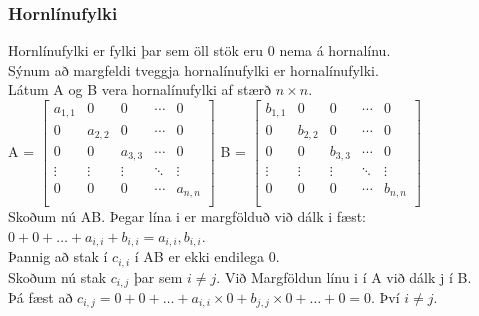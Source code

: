 \subsubsection{Hornlínufylki}
Hornlínufylki er fylki þar sem öll stök eru 0 nema á hornalínu.\\
Sýnum að margfeldi tveggja hornalínufylki er hornalínufylki.\\
Látum A og B vera hornalínufylki af stærð $n \times n$. \vspace*{1em}\\
A = 
$\begin{bmatrix}
    a_{1,1} & 0 & 0 & \cdots & 0 \\
    0 & a_{2,2} & 0 & \cdots & 0 \\
    0 & 0 & a_{3,3} & \cdots & 0 \\
    \vdots & \vdots & \vdots & \ddots & \vdots \\
    0 & 0 & 0 & \cdots & a_{n,n} \\
\end{bmatrix}$ B =
$\begin{bmatrix}
    b_{1,1} & 0 & 0 & \cdots & 0 \\
    0 & b_{2,2} & 0 & \cdots & 0 \\
    0 & 0 & b_{3,3} & \cdots & 0 \\
    \vdots & \vdots & \vdots & \ddots & \vdots \\
    0 & 0 & 0 & \cdots & b_{n,n} \\
\end{bmatrix}$ \vspace*{1em} \\
Skoðum nú AB. Þegar lína i er margfölduð við dálk i fæst:\\ 
$0+0+\ldots+a_{i,i}+b_{i,i} = a_{i,i},b_{i,i}$.\\
Þannig að stak í $c_{i,i}$ í AB er ekki endilega 0.\\
Skoðum nú stak $c_{i,j}$ þar sem $i \not = j$. Við Margföldun línu i í A við dálk j í B.\\
Þá fæst að $c_{i,j} = 0+0+\ldots+a_{i,i}\times0+b_{j,j}\times0+\ldots+0=0$. Því $i \not = j$.\\
\newpage

